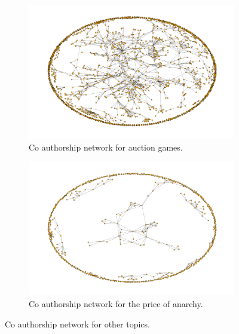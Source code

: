 \documentclass{article}
\begin{document}
\begin{center}
    \begin{figure}[!hbtp]
        \begin{subfigure}{0.5\textwidth}
            \includegraphics[width=\textwidth]{./assets/images/co-authors-network-auction.pdf}
            \caption{Co authorship network for auction games.}
        \end{subfigure}
        \begin{subfigure}{0.5\textwidth}
            \includegraphics[width=\textwidth]{./assets/images/co-authors-network-price.pdf}
            \caption{Co authorship network for the price of anarchy.}
        \end{subfigure}
    \caption{Co authorship network for other topics.}
    \label{fig:co-authorship-other-topics}
    \end{figure}
    \end{center}
\end{document}
